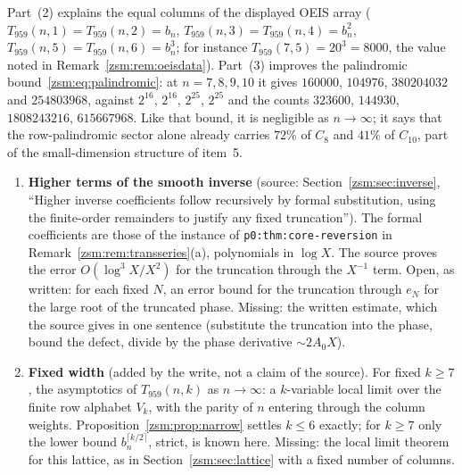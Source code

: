 \documentclass[11pt]{article}
\theoremstyle{definition}\newtheorem{definition}[theorem]{Definition}
\theoremstyle{remark}\newtheorem{remark}[theorem]{Remark}
\newcommand{\file}[1]{\nolinkurl{#1}}
\begin{document}
Part~(2) explains the equal columns of the displayed OEIS array
($T_{959}(n,1)=T_{959}(n,2)=b_n$, $T_{959}(n,3)=T_{959}(n,4)=b_n^2$,
$T_{959}(n,5)=T_{959}(n,6)=b_n^3$; for instance $T_{959}(7,5)=20^3=8000$,
the value noted in Remark~\ref{zsm:rem:oeisdata}). Part~(3) improves the
palindromic bound~\eqref{zsm:eq:palindromic}: at $n=7,8,9,10$ it gives
$160000$, $104976$, $380204032$ and $254803968$, against $2^{16}$, $2^{16}$,
$2^{25}$, $2^{25}$ and the counts $323600$, $144930$, $1808243216$,
$615667968$. Like that bound, it is negligible as $n\to\infty$; it says that
the row-palindromic sector alone already carries $72\%$ of $C_8$ and $41\%$
of $C_{10}$, part of the small-dimension structure of item~5.

\begin{enumerate}[start=8]
\item\label{zsm:q:smoothinverse} \textbf{Higher terms of the smooth inverse}
 (source: Section~\ref{zsm:sec:inverse}, ``Higher inverse coefficients follow
 recursively by formal substitution, using the finite-order remainders to
 justify any fixed truncation''). The formal coefficients are those of the
 instance of \file{p0:thm:core-reversion} in
 Remark~\ref{zsm:rem:transseries}(a), polynomials in $\log X$. The source
 proves the error $O(\log^3X/X^2)$ for the truncation through the $X^{-1}$
 term. Open, as written: for each fixed $N$, an error bound for the
 truncation through $e_N$ for the large root of the truncated phase. Missing:
 the written estimate, which the source gives in one sentence (substitute
 the truncation into the phase, bound the defect, divide by the phase
 derivative $\sim2A_0X$).
\item\label{zsm:q:narrow} \textbf{Fixed width} (added by the write, not a
 claim of the source). For fixed $k\ge7$, the asymptotics of
 $T_{959}(n,k)$ as $n\to\infty$: a $k$-variable local limit over the finite
 row alphabet $V_k$, with the parity of $n$ entering through the column
 weights. Proposition~\ref{zsm:prop:narrow} settles $k\le6$ exactly; for
 $k\ge7$ only the lower bound $b_n^{\lceil k/2\rceil}$, strict, is known
 here. Missing: the local limit theorem for this lattice, as in
 Section~\ref{zsm:sec:lattice} with a fixed number of columns.
\end{enumerate}
\end{document}
